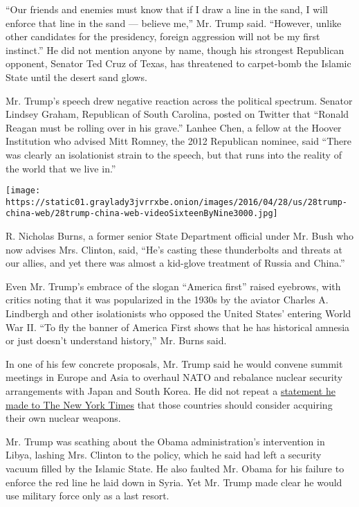 ``Our friends and enemies must know that if I draw a line in the sand, I
will enforce that line in the sand --- believe me,'' Mr. Trump said.
``However, unlike other candidates for the presidency, foreign
aggression will not be my first instinct.'' He did not mention anyone by
name, though his strongest Republican opponent, Senator Ted Cruz of
Texas, has threatened to carpet-bomb the Islamic State until the desert
sand glows.

Mr. Trump's speech drew negative reaction across the political spectrum.
Senator Lindsey Graham, Republican of South Carolina, posted on Twitter
that ``Ronald Reagan must be rolling over in his grave.'' Lanhee Chen, a
fellow at the Hoover Institution who advised Mitt Romney, the 2012
Republican nominee, said ``There was clearly an isolationist strain to
the speech, but that runs into the reality of the world that we live
in.''

\texttt{[image: https://static01.graylady3jvrrxbe.onion/images/2016/04/28/us/28trump-china-web/28trump-china-web-videoSixteenByNine3000.jpg]}

R. Nicholas Burns, a former senior State Department official under Mr.
Bush who now advises Mrs. Clinton, said, ``He's casting these
thunderbolts and threats at our allies, and yet there was almost a
kid-glove treatment of Russia and China.''

Even Mr. Trump's embrace of the slogan ``America first'' raised
eyebrows, with critics noting that it was popularized in the 1930s by
the aviator Charles A. Lindbergh and other isolationists who opposed the
United States' entering World War II. ``To fly the banner of America
First shows that he has historical amnesia or just doesn't understand
history,'' Mr. Burns said.

In one of his few concrete proposals, Mr. Trump said he would convene
summit meetings in Europe and Asia to overhaul NATO and rebalance
nuclear security arrangements with Japan and South Korea. He did not
repeat a
\href{http://www.nytimes3xbfgragh.onion/2016/03/27/us/politics/donald-trump-foreign-policy.html}{statement
he made to The New York Times} that those countries should consider
acquiring their own nuclear weapons.

Mr. Trump was scathing about the Obama administration's intervention in
Libya, lashing Mrs. Clinton to the policy, which he said had left a
security vacuum filled by the Islamic State. He also faulted Mr. Obama
for his failure to enforce the red line he laid down in Syria. Yet Mr.
Trump made clear he would use military force only as a last resort.

